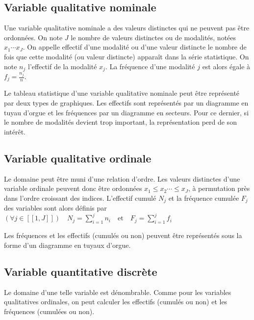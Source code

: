 \documentclass[letterpaper,10pt,english]{jupyterBook}
\begin{document}
\subsection{Variable qualitative nominale}
\label{\detokenize{statsdescriptives:variable-qualitative-nominale}}
\ignorespaces 
\sphinxAtStartPar
Une variable qualitative nominale a des valeurs distinctes qui ne peuvent pas être ordonnées. On note \(J\) le nombre de valeurs distinctes ou de modalités, notées \(x_1\cdots x_J\). On appelle effectif d’une modalité ou d’une valeur distincte le nombre de fois que cette modalité (ou valeur distincte) apparaît dans la série statistique. On note \(n_j\) l’effectif de la modalité \(x_j\). La fréquence d’une modalité \(j\) est  alors égale à \(f_j=\frac{n_j}{n}\).

\sphinxAtStartPar
Le tableau statistique d’une variable qualitative nominale peut être représenté par deux types de graphiques. Les effectifs sont représentés par un diagramme en tuyau d’orgue et les fréquences par un diagramme en secteurs. Pour ce dernier, si le nombre de modalités devient trop important, la représentation perd de son intérêt.

\sphinxAtStartPar
{}


\subsection{Variable qualitative ordinale}
\label{\detokenize{statsdescriptives:variable-qualitative-ordinale}}
\ignorespaces 
\sphinxAtStartPar
Le domaine peut être muni d’une relation d’ordre.  Les valeurs distinctes d’une variable ordinale peuvent donc être ordonnées \(x_1\leq x_2\cdots\leq  x_J\), à permutation près dans l’ordre croissant des indices. L’effectif cumulé \(N_j\) et la fréquence cumulée \(F_j\) des variables sont alors définis par
\((\forall j\in[\![1,J]\!])\quad N_j=\displaystyle\sum_{i=1}^j n_i\quad \textrm {et}\quad F_j=\displaystyle\sum_{i=1}^j f_i\)

\sphinxAtStartPar
Les fréquences et les effectifs (cumulés ou non) peuvent être représentés sous la forme d’un diagramme en tuyaux d’orgue.


\subsection{Variable quantitative discrète}
\label{\detokenize{statsdescriptives:variable-quantitative-discrete}}
\ignorespaces 
\sphinxAtStartPar
Le domaine d’une telle variable est dénombrable. Comme pour les variables qualitatives ordinales, on peut calculer les effectifs (cumulés ou non) et les fréquences (cumulées ou non).
\end{document}
